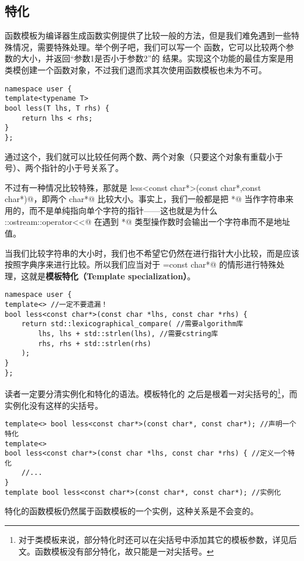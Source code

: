 \subsection*{特化}
函数模板为编译器生成函数实例提供了比较一般的方法，但是我们难免遇到一些特殊情况，需要特殊处理。举个例子吧，我们可以写一个 \lstinline@less@ 函数，它可以比较两个参数的大小，并返回``参数1是否小于参数2''的 \lstinline@bool@ 结果。实现这个功能的最佳方案是用类模创建一个函数对象，不过我们退而求其次使用函数模板也未为不可。
\begin{lstlisting}
namespace user {
template<typename T>
bool less(T lhs, T rhs) {
    return lhs < rhs;
}
};
\end{lstlisting}
通过这个，我们就可以比较任何两个数、两个对象（只要这个对象有重载小于号）、两个指针的小于号关系了。\par
不过有一种情况比较特殊，那就是 \lstinline@bool less<const char*>(const char*,const char*)@，即两个 \lstinline@const char*@ 比较大小。事实上，我们一般都是把 \lstinline@char*@ 当作字符串来用的，而不是单纯指向单个字符的指针——这也就是为什么 \lstinline@std::ostream::operator<<@ 在遇到 \lstinline@char*@ 类型操作数时会输出一个字符串而不是地址值。\par
当我们比较字符串的大小时，我们也不希望它仍然在进行指针大小比较，而是应该按照字典序来进行比较。所以我们应当对于 \lstinline@T=const char*@ 的情形进行特殊处理，这就是\textbf{模板特化（Template specialization）}。\par
\begin{lstlisting}
namespace user {
template<> //一定不要遗漏！
bool less<const char*>(const char *lhs, const char *rhs) {
    return std::lexicographical_compare( //需要algorithm库
        lhs, lhs + std::strlen(lhs), //需要cstring库
        rhs, rhs + std::strlen(rhs)
    );
}
};
\end{lstlisting}\par
读者一定要分清实例化和特化的语法。模板特化的 \lstinline@template@ 之后是根着一对尖括号的\footnote{对于类模板来说，部分特化时还可以在尖括号中添加其它的模板参数，详见后文。函数模板没有部分特化，故只能是一对尖括号。}，而实例化没有这样的尖括号。
\begin{lstlisting}
template<> bool less<const char*>(const char*, const char*); //声明一个特化
template<>
bool less<const char*>(const char *lhs, const char *rhs) { //定义一个特化
    //...
}
template bool less<const char*>(const char*, const char*); //实例化
\end{lstlisting}\par
特化的函数模板仍然属于函数模板的一个实例，这种关系是不会变的。\par
